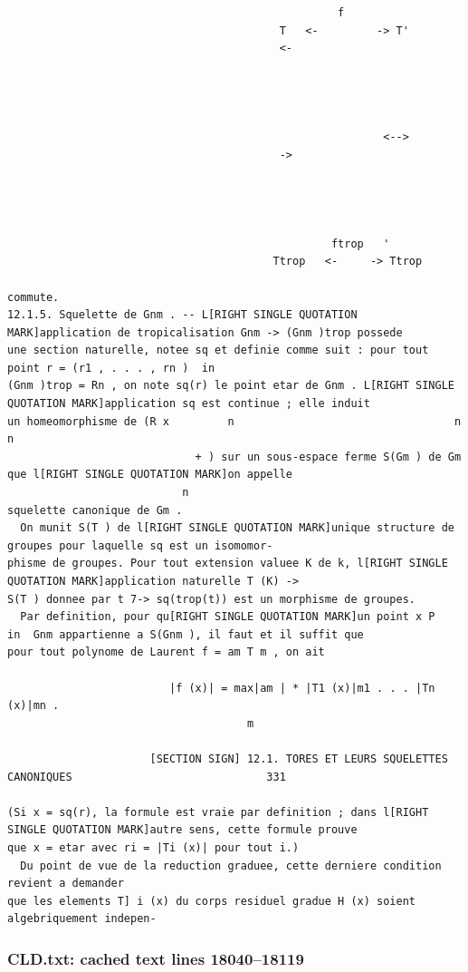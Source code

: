 \documentclass[
  11pt,
]{article}
\begin{document}
\begin{lstlisting}
                                                   f
                                          T   <-         -> T'
                                          <-




                                                          <-->
                                          ->




                                                  ftrop   '
                                         Ttrop   <-     -> Ttrop

commute.
12.1.5. Squelette de Gnm . -- L[RIGHT SINGLE QUOTATION MARK]application de tropicalisation Gnm -> (Gnm )trop possede
une section naturelle, notee sq et definie comme suit : pour tout point r = (r1 , . . . , rn )  in 
(Gnm )trop = Rn , on note sq(r) le point etar de Gnm . L[RIGHT SINGLE QUOTATION MARK]application sq est continue ; elle induit
un homeomorphisme de (R x         n                                  n        n
                             + ) sur un sous-espace ferme S(Gm ) de Gm que l[RIGHT SINGLE QUOTATION MARK]on appelle
                           n
squelette canonique de Gm .
  On munit S(T ) de l[RIGHT SINGLE QUOTATION MARK]unique structure de groupes pour laquelle sq est un isomomor-
phisme de groupes. Pour tout extension valuee K de k, l[RIGHT SINGLE QUOTATION MARK]application naturelle T (K) ->
S(T ) donnee par t 7-> sq(trop(t)) est un morphisme de groupes.
  Par definition, pour qu[RIGHT SINGLE QUOTATION MARK]un point x P    in  Gnm appartienne a S(Gnm ), il faut et il suffit que
pour tout polynome de Laurent f = am T m , on ait

                         |f (x)| = max|am | * |T1 (x)|m1 . . . |Tn (x)|mn .
                                     m

                      [SECTION SIGN] 12.1. TORES ET LEURS SQUELETTES CANONIQUES                              331

(Si x = sq(r), la formule est vraie par definition ; dans l[RIGHT SINGLE QUOTATION MARK]autre sens, cette formule prouve
que x = etar avec ri = |Ti (x)| pour tout i.)
  Du point de vue de la reduction graduee, cette derniere condition revient a demander
que les elements T] i (x) du corps residuel gradue H (x) soient algebriquement indepen-
\end{lstlisting}

\subsubsection{CLD.txt: cached text lines
18040--18119}\label{cld.txt-cached-text-lines-1804018119}
\end{document}
